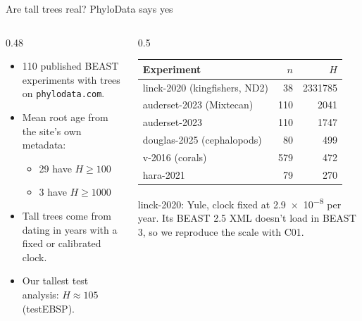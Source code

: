 \documentclass[aspectratio=169,11pt]{beamer}
\begin{document}
\begin{frame}{Are tall trees real? PhyloData says yes}
  \begin{columns}[T]
    \begin{column}{0.48\textwidth}
      \begin{itemize}
        \item 110 published BEAST experiments with trees on \texttt{phylodata.com}.
        \item Mean root age from the site's own metadata:
          \begin{itemize}
            \item 29 have $H \ge 100$
            \item 3 have $H \ge 1000$
          \end{itemize}
        \item Tall trees come from dating in years with a fixed or calibrated clock.
        \item Our tallest test analysis: $H \approx 105$ (testEBSP).
      \end{itemize}
    \end{column}
    \begin{column}{0.5\textwidth}
      \small
      \begin{tabular}{lrr}
        \toprule
        Experiment & $n$ & $H$ \\
        \midrule
        linck-2020 (kingfishers, ND2) & 38 & \num{2331785} \\
        auderset-2023 (Mixtecan) & 110 & \num{2041} \\
        auderset-2023 & 110 & \num{1747} \\
        douglas-2025 (cephalopods) & 80 & 499 \\
        v-2016 (corals) & 579 & 472 \\
        hara-2021 & 79 & 270 \\
        \bottomrule
      \end{tabular}

      \vspace{0.6em}
      \footnotesize\color{ink2} linck-2020: Yule, clock fixed at \num{2.9e-8} per year.
      Its BEAST 2.5 XML doesn't load in BEAST 3, so we reproduce the scale with C01.
    \end{column}
  \end{columns}
\end{frame}
\end{document}
